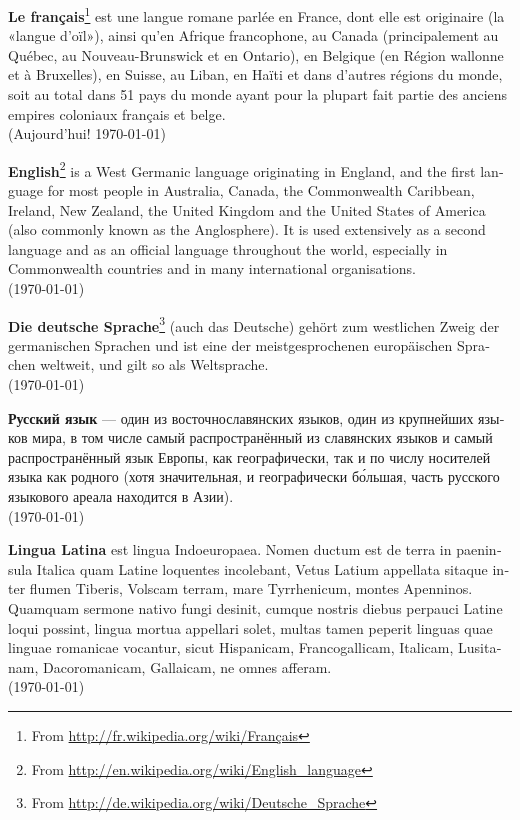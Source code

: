 \documentclass[a4paper]{article}
\begin{document}
\noindent
\textbf{Le français}\footnote{ From \url{http://fr.wikipedia.org/wiki/Français}} est une langue romane parlée en France, dont elle est originaire (la «langue d'oïl»), ainsi qu'en Afrique francophone, au Canada (principalement au Québec, au Nouveau-Brunswick et en Ontario), en Belgique (en Région wallonne et à Bruxelles), en Suisse, au Liban, en Haïti et dans d'autres régions du monde, soit au total dans 51 pays du monde ayant pour la plupart fait partie des anciens empires coloniaux français et belge. \\
(Aujourd'hui! \today)

\begin{english}
\textbf{English}\footnote{From \url{http://en.wikipedia.org/wiki/English_language}} is a West Germanic language originating in England, and the first language for most people in Australia, Canada, the Commonwealth Caribbean, Ireland, New Zealand, the United Kingdom and the United States of America (also commonly known as the Anglosphere). It is used extensively as a second language and as an official language throughout the world, especially in Commonwealth countries and in many international organisations. \\
(\today)
\end{english}

\begin{german}
\textbf{Die deutsche Sprache}\footnote{ From \url{http://de.wikipedia.org/wiki/Deutsche_Sprache}} (auch das Deutsche) gehört zum westlichen Zweig der germanischen Sprachen und ist eine der meistgesprochenen europäischen Sprachen weltweit, und gilt so als Weltsprache.\\
(\today)
\end{german}

\begin{russian}
\textbf{Русский язык} — один из восточнославянских языков, один из крупнейших языков мира, в том числе самый распространённый из славянских языков и самый распространённый язык Европы, как географически, так и по числу носителей языка как родного (хотя значительная, и географически бо́льшая, часть русского языкового ареала находится в Азии).	\\
(\today)
\end{russian}

\begin{latin}
\textbf{Lingua Latina} est lingua Indoeuropaea. Nomen ductum est de terra in paeninsula Italica quam Latine loquentes incolebant, Vetus Latium appellata sitaque inter flumen Tiberis, Volscam terram, mare Tyrrhenicum, montes Apenninos. 
Quamquam sermone nativo fungi desinit, cumque nostris diebus perpauci Latine loqui possint, lingua mortua appellari solet, multas tamen peperit linguas quae linguae romanicae vocantur, sicut Hispanicam, Francogallicam, Italicam, Lusitanam, Dacoromanicam, Gallaicam, ne omnes afferam. \\
(\today) 
\end{latin}
\end{document}
